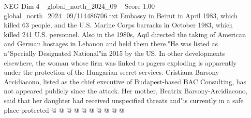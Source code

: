 \begin{textsample}{NEG Dim 4 – global\_north\_2024\_09 – Score 1.00 – global\_north\_2024\_09/114486706.txt}
Embassy in Beirut in April 1983, which killed 63 people, and the U.S.
Marine Corps barracks in October 1983, which killed 241 U.S. personnel.
Also in the 1980s, Aqil directed the taking of American and German hostages in Lebanon and held them there."He was listed as a"Specially Designated National"in 2015 by the US.
In other developments elsewhere, the woman whose firm was linked to pagers exploding is apparently under the protection of the Hungarian secret services.
Cristiana Barsony-Arcidiacono, listed as the chief executive of Budapest-based BAC Consulting, has not appeared publicly since the attack.
Her mother, Beatrix Barsony-Arcidiacono, said that her daughter had received unspecified threats and"is currently in a safe place protected @ @ @ @ @ @ @ @ @ @

\end{textsample}
